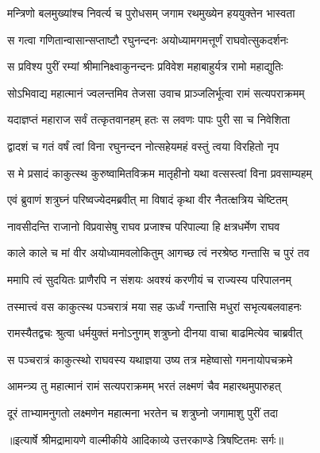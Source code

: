 \twolineshloka
{मन्त्रिणो बलमुख्यांश्च निवर्त्य च पुरोधसम्}
{जगाम रथमुख्येन हययुक्तेन भास्वता} %

\twolineshloka
{स गत्वा गणितान्वासान्सप्ताष्टौ रघुनन्दनः}
{अयोध्यामगमत्तूर्णं राघवोत्सुकदर्शनः} %

\twolineshloka
{स प्रविश्य पुरीं रम्यां श्रीमानिक्ष्वाकुनन्दनः}
{प्रविवेश महाबाहुर्यत्र रामो महाद्युतिः} %

\twolineshloka
{सोऽभिवाद्य महात्मानं ज्वलन्तमिव तेजसा}
{उवाच प्राञ्जलिर्भूत्वा रामं सत्यपराक्रमम्} %

\twolineshloka
{यदाज्ञप्तं महाराज सर्वं तत्कृतवानहम्}
{हतः स लवणः पापः पुरी सा च निवेशिता} %

\twolineshloka
{द्वादशं च गतं वर्षं त्वां विना रघुनन्दन}
{नोत्सहेयमहं वस्तुं त्वया विरहितो नृप} %

\twolineshloka
{स मे प्रसादं काकुत्स्थ कुरुष्वामितविक्रम}
{मातृहीनो यथा वत्सस्त्वां विना प्रवसाम्यहम्} %

\twolineshloka
{एवं ब्रुवाणं शत्रुघ्नं परिष्वज्येदमब्रवीत्}
{मा विषादं कृथा वीर नैतत्क्षत्रिय चेष्टितम्} %

\twolineshloka
{नावसीदन्ति राजानो विप्रवासेषु राघव}
{प्रजाश्च परिपाल्या हि क्षत्रधर्मेण राघव} %

\twolineshloka
{काले काले च मां वीर अयोध्यामवलोकितुम्}
{आगच्छ त्वं नरश्रेष्ठ गन्तासि च पुरं तव} %

\twolineshloka
{ममापि त्वं सुदयितः प्राणैरपि न संशयः}
{अवश्यं करणीयं च राज्यस्य परिपालनम्} %

\twolineshloka
{तस्मात्त्वं वस काकुत्स्थ पञ्चरात्रं मया सह}
{ऊर्ध्वं गन्तासि मधुरां सभृत्यबलवाहनः} %

\twolineshloka
{रामस्यैतद्वचः श्रुत्वा धर्मयुक्तं मनोऽनुगम्}
{शत्रुघ्नो दीनया वाचा बाढमित्येव चाब्रवीत्} %

\twolineshloka
{स पञ्चरात्रं काकुत्स्थो राघवस्य यथाज्ञया}
{उष्य तत्र महेष्वासो गमनायोपचक्रमे} %

\twolineshloka
{आमन्त्र्य तु महात्मानं रामं सत्यपराक्रमम्}
{भरतं लक्ष्मणं चैव महारथमुपारुहत्} %

\twolineshloka
{दूरं ताभ्यामनुगतो लक्ष्मणेन महात्मना}
{भरतेन च शत्रुघ्नो जगामाशु पुरीं तदा} %


{॥इत्यार्षे श्रीमद्रामायणे वाल्मीकीये आदिकाव्ये उत्तरकाण्डे त्रिषष्टितमः सर्गः॥}



